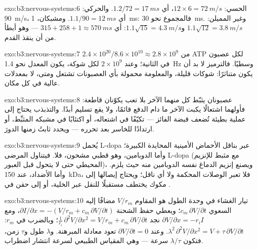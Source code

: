 \begin{solution}{exo:b3:nervous-systems:6}
الحسي: $12\times 6 = \qty{72}{m/s}$، أي $1.2/72 = \qty{17}{ms}$.
والحركي: \qty{90}{m/s}، أي $1.1/90 = \qty{12}{ms}$. ومشبكان،
\qty{1}{ms}: فالمجموع نحو \qty{30}{ms}. وغير المميلن:
$1.1\sqrt{12} = \qty{3.8}{m/s}$ و$1.1\sqrt{15} = \qty{4.3}{m/s}$: أي
$315 + 258 + 1 \approx \qty{570}{ms}$ --- وهو أبطأ من أن ينقذ
القدم.
\end{solution}

\begin{solution}{exo:b3:nervous-systems:7}
$2.4\times 10^{20}/8.6\times 10^{10} \approx 2.8\times 10^{9}$ من ATP
لكل عصبون في الثانية؛ وعند $2\times 10^{9}$ لكل شوكة، يكون
المعدل نحو \qty{1.4}{Hz} وسطيًا. فالترميز لا بد أن يكون
متناثرًا: شوكات قليلة، والمعلومة محمولة بأي العصبونات تشتعل
ومتى، لا بمعدلات عالية في كل مكان.
\end{solution}

\begin{solution}{exo:b3:nervous-systems:8}
عصبونان يثبّط كل منهما الآخر بلا تعب يكوّنان قاطعة: فأولهما
اشتعالًا يكبت الآخر ما دام الدفع قائمًا، ولا يقع تسليم أبدًا.
والتذبذب يحتاج إلى عملية بطيئة تُضعف قبضة الفائز ---
تكيّفًا في اشتعاله، أو اكتئابًا في مشبكه المثبِّط، أو ارتدادًا
للخاسر بعد تحرره --- ويحدد ثابتُ زمنها الدورَ.
\end{solution}

\begin{solution}{exo:b3:nervous-systems:9}
يُحمل L-dopa عبر  بناقل الأحماض الأمينية المحايدة
الكبيرة؛ وأما الدوبامين، وهو قطبي مشحون، فلا. فيتناول
المرضى L-dopa (مع مثبط للإنزيم المحيطي حتى لا يتحول قبل
العبور)، ويصنع إنزيم الدماغ نفسه الدوبامين منه حيث يلزم.
وأما الأضداد، عند \qty{150}{kDa}، فلا تعبر الوصلات المحكمة
ولا أي ناقل؛ ويحتاج إيصالها إلى مكوك يختطف مستقبلًا للنقل
عبر الخلية، أو إلى حقن في .
\end{solution}

\begin{solution}{exo:b3:nervous-systems:10}
تيار الغشاء في وحدة الطول هو المقاوم $V/r_{m}$ مضافًا إليه
السعوي $c_{m}\,\partial V/\partial t$؛ ويعطي حفظ الشحنة
$\partial I/\partial x = -(V/r_{m} + c_{m}\,\partial V/\partial t)$،
ومع $\partial V/\partial x = -r_{i}I$ نجد $\frac{1}{r_{i}}\,\partial^{2}V/
\partial x^{2} = V/r_{m} + c_{m}\,\partial V/\partial t$؛ وبالضرب في
$r_{m}$: $\lambda^{2}\,\partial^{2}V/\partial x^{2} = V + \tau\,\partial
V/\partial t$. وعند $\partial V/\partial t = 0$ تعود معادلة
المبرهنة. و$\lambda$ طول و$\tau$ زمن، فتكون $\lambda/\tau$
سرعة --- وهي المقياس الطبيعي لسرعة انتشار اضطراب.
\end{solution}

